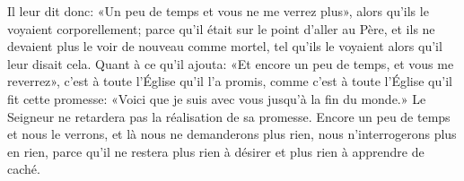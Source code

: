 Il leur dit donc: «Un peu de temps et vous ne me verrez plus»,
	alors qu’ils le voyaient corporellement;
	parce qu’il était sur le point d’aller au Père,
	et ils ne devaient plus le voir de nouveau comme mortel,
	tel qu’ils le voyaient alors qu’il leur disait cela.
Quant à ce qu’il ajouta: «Et encore un peu de temps, et vous me reverrez»,
	c’est à toute l’Église qu’il l’a promis,
	comme c’est à toute l’Église qu’il fit cette promesse:
	«Voici que je suis avec vous jusqu’à la fin du monde.»
Le Seigneur ne retardera pas la réalisation de sa promesse.
Encore un peu de temps et nous le verrons,
	et là nous ne demanderons plus rien, nous n’interrogerons plus en rien,
	parce qu’il ne restera plus rien à désirer
	et plus rien à apprendre de caché.
